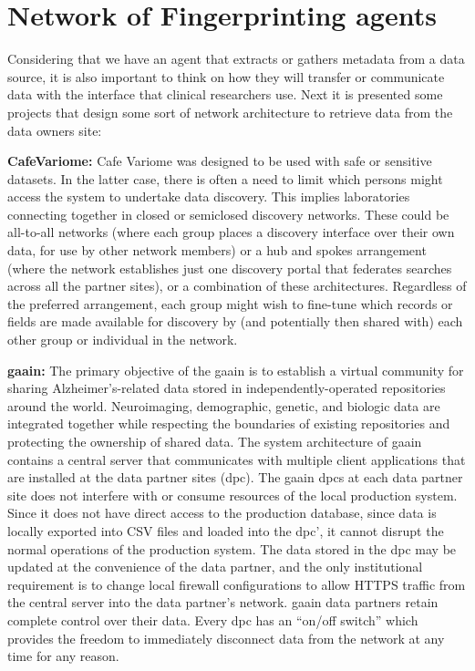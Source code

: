 
\section{Network of Fingerprinting agents}

Considering that we have an agent that extracts or gathers metadata from a data source,
it is also important to think on how they will transfer or communicate data with the
interface that clinical researchers use.
Next it is presented some projects that design some sort of network architecture to
retrieve data from the data owners site:

\textbf{CafeVariome\cite{cafevariome}: }
Cafe Variome was designed to be used with safe or sensitive datasets.
In the latter case, there is often a need to limit which persons might access the
system to undertake data discovery.
This implies laboratories connecting together in closed or semiclosed discovery
networks.
These could be all-to-all networks (where each group places a discovery interface over
their own data, for use by other network members) or a hub and spokes arrangement
(where the network establishes just one discovery portal that federates searches across
all the partner sites), or a combination of these architectures.
Regardless of the preferred arrangement, each group might wish to fine-tune which
records or fields are made available for discovery by (and potentially then shared
with) each other group or individual in the network.

\textbf{\gls{gaain}\cite{gaain}:}
The primary objective of the \gls{gaain}
is to establish a virtual community for sharing Alzheimer's-related data stored in
independently-operated repositories around the world.
Neuroimaging, demographic, genetic, and biologic data are integrated together while
respecting the boundaries of existing repositories and protecting the ownership of
shared data.
The system architecture of \gls{gaain} contains a central server that communicates with
multiple client applications that are installed at the data partner sites (\gls{dpc}).
The \gls{gaain} \gls{dpc}s at each data partner site does not interfere with or consume
resources of the local production system.
Since it does not have direct access to the production database, since data is locally
exported into CSV files and loaded into the \gls{dpc}', it cannot disrupt
the normal operations of the production system.
The data stored in the \gls{dpc} may be updated at the convenience of the data partner,
and the only institutional requirement is to change local firewall configurations to
allow HTTPS traffic from the central server into the data partner's network.
\gls{gaain} data partners retain complete control over their data.
Every \gls{dpc} has an “on/off switch” which provides the freedom to immediately
disconnect data from the network at any time for any reason.

